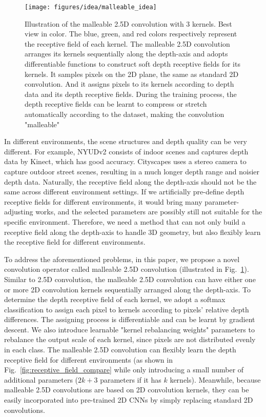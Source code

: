 \documentclass[runningheads]{llncs}
\begin{document}
\begin{figure}[tbp]
  \centering
  \texttt{[image: figures/idea/malleable\_idea]}
  \caption{
  Illustration of the malleable 2.5D convolution with 3 kernels.
  Best view in color.
  The blue, green, and red colors respectively represent the receptive field of each kernel.
  The malleable 2.5D convolution arranges its kernels sequentially along the depth-axis and adopts differentiable functions to construct soft depth receptive fields for its kernels.
  It samples pixels on the 2D plane, the same as standard 2D convolution.
  And it assigns pixels to its kernels according to depth data and its depth receptive fields.
  During the training process, the depth receptive fields can be learnt to compress or stretch automatically according to the dataset, making the convolution "malleable"
  }
  \label{fig:idea_illustration}
\end{figure}

In different environments, the scene structures and depth quality can be very different.
For example, NYUDv2\cite{NYUDv2} consists of indoor scenes and captures depth data by Kinect, which has good accuracy.
Cityscapes\cite{Cityscapes} uses a stereo camera to capture outdoor street scenes, resulting in a much longer depth range and noisier depth data.
Naturally, the receptive field along the depth-axis should not be the same across different environment settings.
If we artificially pre-define depth receptive fields for different environments, it would bring many parameter-adjusting works, and the selected parameters are possibly still not suitable for the specific environment.
Therefore, we need a method that can not only build a receptive field along the depth-axis to handle 3D geometry, but also flexibly learn the receptive field for different environments.

To address the aforementioned problems, in this paper, we propose a novel convolution operator called malleable 2.5D convolution (illustrated in Fig.~\ref{fig:idea_illustration}).
Similar to 2.5D convolution, the malleable 2.5D convolution can have either one or more 2D convolution kernels sequentially arranged along the depth-axis.
To determine the depth receptive field of each kernel, we adopt a softmax classification to assign each pixel to kernels according to pixels' relative depth differences.
The assigning process is differentiable and can be learnt by gradient descent.
We also introduce learnable "kernel rebalancing weights" parameters to rebalance the output scale of each kernel, since pixels are not distributed evenly in each class.
The malleable 2.5D convolution can flexibly learn the depth receptive field for different environments (as shown in Fig.~\ref{fig:receptive_field_compare} while only introducing a small number of additional parameters ($2k+3$ parameters if it has $k$ kernels).
Meanwhile, because malleable 2.5D convolutions are based on 2D convolution kernels, they can be easily incorporated into pre-trained 2D CNNs by simply replacing standard 2D convolutions.
\end{document}
